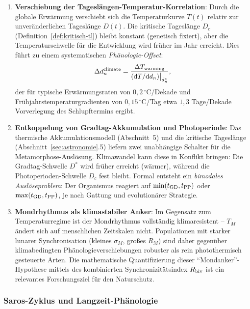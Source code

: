 ﻿\documentclass[12pt, a4paper]{article}
\theoremstyle{definition}
\newcommand{\dd}{\mathrm{d}}
\begin{document}
\begin{enumerate}
  \item \textbf{Verschiebung der Tageslängen-Temperatur-Korrelation}:
        Durch die globale Erwärmung verschiebt sich die Temperaturkurve $T(t)$
        relativ zur unveränderlichen Tageslänge $D(t)$. Die kritische Tageslänge
        $D_c$ (Definition~\ref{def:kritisch-tl}) bleibt konstant (genetisch
        fixiert), aber die Temperaturschwelle für die Entwicklung wird früher im
        Jahr erreicht. Dies führt zu einem systematischen \emph{Phänologie-Offset}:
        \[
          \Delta d_n^{\rm climate} = \frac{\Delta T_{\rm warming}}{(\dd T/\dd d_n)\big|_{d_n^*}},
        \]
        der für typische Erwärmungsraten von $0{,}2\,^\circ\text{C}$/Dekade und
        Frühjahrstemperaturgradienten von $0{,}15\,^\circ\text{C}$/Tag etwa
        $1{,}3$ Tage/Dekade Vorverlegung des Schlupftermins ergibt.

  \item \textbf{Entkoppelung von Gradtag-Akkumulation und Photoperiode}:
        Das thermische Akkumulationsmodell (Abschnitt~5) und die kritische
        Tageslänge (Abschnitt~\ref{sec:astronomie}.5) liefern zwei unabhängige
        Schalter für die Metamorphose-Auslösung. Klimawandel kann diese in
        Konflikt bringen: Die Gradtag-Schwelle $D^*$ wird früher erreicht (wärmer),
        während die Photoperioden-Schwelle $D_c$ fest bleibt. Formal entsteht ein
        \emph{bimodales Auslöseproblem}: Der Organismus reagiert auf
        $\min(t_{\rm GD}, t_{\rm PP})$ oder $\max(t_{\rm GD}, t_{\rm PP})$,
        je nach Gattung und evolutionärer Strategie.

  \item \textbf{Mondrhythmus als klimastabiler Anker}:
        Im Gegensatz zum Temperaturregime ist der Mondrhythmus vollständig
        klimaresistent -- $T_M$ ändert sich auf menschlichen Zeitskalen nicht.
        Populationen mit starker lunarer Synchronisation (kleines $\sigma_M$,
        großes $R_M$) sind daher gegenüber klimabedingten Phänologieverschie\-bungen
        robuster als rein photothermisch gesteuerte Arten. Die mathematische
        Quantifizierung dieser ``Mondanker''-Hypothese mittels des kombinierten
        Synchronizitätsindex $R_{\rm biv}$ ist ein relevantes Forschungsziel für
        den Naturschutz.
\end{enumerate}

\subsubsection{Saros-Zyklus und Langzeit-Phänologie}
\end{document}
